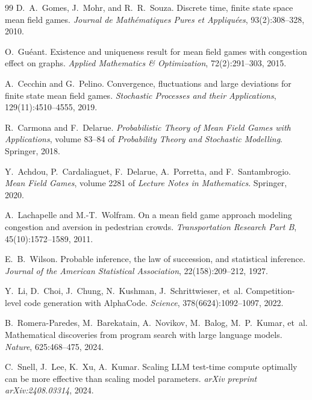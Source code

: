 \documentclass[11pt]{amsart}
\newcommand\1{{\mathds{1}}}
\theoremstyle{definition}
\theoremstyle{remark}
\numberwithin{equation}{section}
\begin{document}
\begin{thebibliography}{99}
D.~A.~Gomes, J.~Mohr, and R.~R.~Souza.
\newblock Discrete time, finite state space mean field games.
\newblock \emph{Journal de Math\'ematiques Pures et Appliqu\'ees}, 93(2):308--328, 2010.

O.~Gu\'eant.
\newblock Existence and uniqueness result for mean field games with congestion effect on graphs.
\newblock \emph{Applied Mathematics \& Optimization}, 72(2):291--303, 2015.

A.~Cecchin and G.~Pelino.
\newblock Convergence, fluctuations and large deviations for finite state mean field games.
\newblock \emph{Stochastic Processes and their Applications}, 129(11):4510--4555, 2019.

R.~Carmona and F.~Delarue.
\newblock \emph{Probabilistic Theory of Mean Field Games with Applications}, volume 83--84 of \emph{Probability Theory and Stochastic Modelling}.
\newblock Springer, 2018.

Y.~Achdou, P.~Cardaliaguet, F.~Delarue, A.~Porretta, and F.~Santambrogio.
\newblock \emph{Mean Field Games}, volume 2281 of \emph{Lecture Notes in Mathematics}.
\newblock Springer, 2020.

A.~Lachapelle and M.-T.~Wolfram.
\newblock On a mean field game approach modeling congestion and aversion in pedestrian crowds.
\newblock \emph{Transportation Research Part B}, 45(10):1572--1589, 2011.

E.~B.~Wilson.
\newblock Probable inference, the law of succession, and statistical inference.
\newblock \emph{Journal of the American Statistical Association}, 22(158):209--212, 1927.


Y.~Li, D.~Choi, J.~Chung, N.~Kushman, J.~Schrittwieser, et~al.
\newblock Competition-level code generation with AlphaCode.
\newblock \emph{Science}, 378(6624):1092--1097, 2022.

B.~Romera-Paredes, M.~Barekatain, A.~Novikov, M.~Balog, M.~P.~Kumar, et~al.
\newblock Mathematical discoveries from program search with large language models.
\newblock \emph{Nature}, 625:468--475, 2024.

C.~Snell, J.~Lee, K.~Xu, A.~Kumar.
\newblock Scaling LLM test-time compute optimally can be more effective than scaling model parameters.
\newblock \emph{arXiv preprint arXiv:2408.03314}, 2024.


\end{thebibliography}
\end{document}
